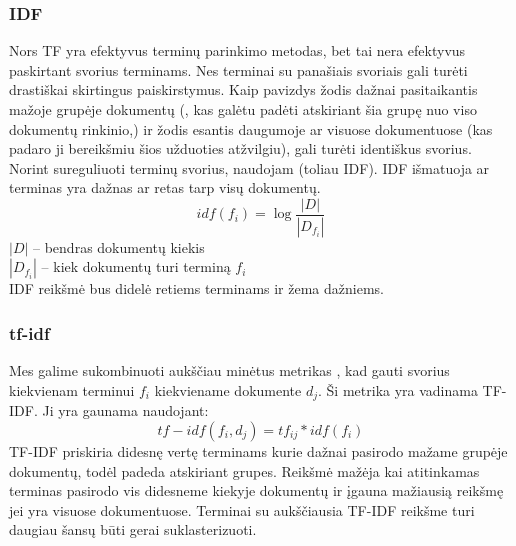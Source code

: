 \documentclass{VUMIFInfKursinis}
\begin{document}
		\subsubsection{IDF}
			Nors TF yra efektyvus terminų parinkimo metodas, bet tai nera efektyvus paskirtant svorius terminams. Nes terminai su panašiais svoriais gali turėti drastiškai skirtingus paiskirstymus. Kaip pavizdys žodis dažnai pasitaikantis mažoje grupėje dokumentų (, kas galėtu padėti atskiriant šia grupę nuo viso dokumentų rinkinio,) ir žodis esantis daugumoje ar visuose dokumentuose (kas padaro ji bereikšmiu šios užduoties atžvilgiu), gali turėti identiškus svorius. Norint sureguliuoti terminų svorius, naudojam  (toliau IDF). IDF išmatuoja ar terminas yra dažnas ar retas tarp visų dokumentų.
			\begin{equation}
				idf(f_i)=\log\frac{|D|}{|D_{f_i}|}
			\end{equation}
			$|D|$ – bendras dokumentų kiekis\\
			$|D_{f_i}|$  – kiek dokumentų turi terminą $f_i$\\
			IDF reikšmė bus didelė retiems terminams ir žema dažniems.

		\subsubsection{tf-idf}
			Mes galime sukombinuoti aukščiau minėtus metrikas , kad gauti svorius kiekvienam terminui $f_i$ kiekviename dokumente $d_j$. Ši metrika yra vadinama TF-IDF\@. Ji yra gaunama naudojant:
			\begin{equation}
				tf-idf(f_i,d_j) = tf_{ij} * idf (f_i)
			\end{equation}
			TF-IDF priskiria didesnę vertę terminams kurie dažnai pasirodo mažame grupėje dokumentų, todėl padeda atskiriant grupes. Reikšmė mažėja kai atitinkamas terminas pasirodo vis didesneme kiekyje dokumentų ir įgauna mažiausią reikšmę jei yra visuose dokumentuose. Terminai su aukščiausia TF-IDF reikšme turi daugiau šansų būti gerai suklasterizuoti. 
\end{document}
